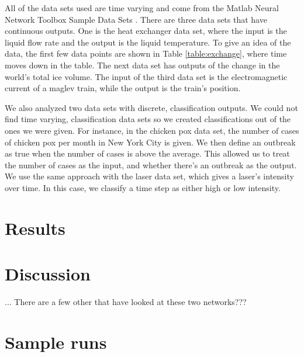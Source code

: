 \documentclass{acm_proc_article-sp}
\newcommand{\todo}[1]{\textcolor{orange}{\textbf{TODO}: #1}} %
\begin{document}
All of the data sets used are time varying and come from the Matlab Neural Network Toolbox Sample Data Sets \cite{data}. 
There are three data sets that have continuous outputs. One is the heat exchanger data set, where the input is the liquid flow rate and the output is the liquid temperature. 
To give an idea of the data, the first few data points are shown in Table \ref{table:exchange}, where time moves down in the table. 
The next data set has outputs of the change in the world's total ice volume. %
The input of the third data set is the electromagnetic current of a maglev train, while the output is the train's position.

We also analyzed two data sets with discrete, classification outputs. We could not find time varying, classification data sets so we created classifications out of the ones we were given. For instance, in the chicken pox data set, the number of cases of chicken pox per month in New York City is given. We then define an outbreak as true when the number of cases is above the average. This allowed us to treat the number of cases as the input, and whether there's an outbreak as the output. We use the same approach with the laser data set, which gives a laser's intensity over time. In this case, we classify a time step as either high or low intensity.


\section{Results}

\section{Discussion}

... There are a few other that have looked at these two networks???





\appendix

\section{Sample runs}
\end{document}

